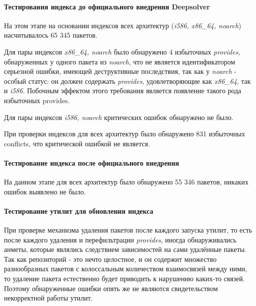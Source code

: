 \paragraph{Тестирования индекса до официального внедрения Deepsolver\\}
На этом этапе на основании индексов всех архитектур (\textit{i586, x86\_64, noarch})
насчитывалось 65 345 пакетов.

Для пары индексов  \textit{x86\_64, noarch} было обнаружено 4 избыточных \textit{provides}, 
обнаруженных у одного пакета из \textit{noarch}, что не является идентификатором серьезной
ошибки, имеющей деструктивные последствия, так как у \textit{noarch} - особый статус: он должен
содержать \textit{provides}, удовлетворяющие как \textit{x86\_64}, так и \textit{i586}. Побочным
эффектом этого требования является появление такого рода избыточных provides.

Для пары индексов \textit{i586, noarch} критических ошибок обнаружено не было.

При проверки индексов для всех архитектур было обнаружено 831 избыточных conflicts, что
критической ошибкой не является.

\paragraph{Тестирование индекса после официального внедрения\\}
На данном этапе для всех архитектур было обнаружено 55 346 пакетов, никаких
ошибок выявлено не было.\\

\paragraph{Тестирование утилит для обновления индекса}
При проверке механизма удаления пакетов после каждого  запуска утилит, то есть
после каждого удаления и перефильтрации \textit{provides}, иногда обнаруживались
анметы, которые являлись следствием зависимостей на сами удалённые пакеты. Так 
как репозиторий - это нечто целостное, и он содержит множество разнообразных пакетов
с колоссальным количеством взаимосвязей между ними, то удаление пакета
естественно будет приводить к нарушению каких-то связей. Поэтому обнаруженные ошибки
опять же не являются свидетельством некорректной работы утилит.














